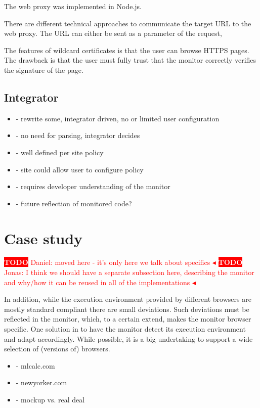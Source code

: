 \documentclass{llncs}
\newcommand{\todo}[1]{\colorbox{red}{\textcolor{white}{\sffamily\bfseries\scriptsize TODO}} \textcolor{red}{#1} \textcolor{red}{$\blacktriangleleft$}}
\begin{document}
The web proxy was implemented in Node.js. 

There are different technical approaches to communicate the target URL to the web 
proxy. The URL can either be sent as a parameter of the request, 

The features of wildcard certificates is that the user can browse HTTPS pages. The drawback is that the user must fully trust that the monitor correctly verifies the signature of the page.

\subsection{Integrator}

\begin{itemize}
\item- rewrite some, integrator driven, no or limited user configuration
\item- no need for parsing, integrator decides
\item- well defined per site policy
\item- site could allow user to configure policy
\item- requires developer understanding of the monitor
\item- future reflection of monitored code?
\end{itemize}


\section{Case study}
\label{sec:case}

\todo{Daniel: moved here - it's only here we talk about specifics}
\todo{Jonas: I think we should have a separate subsection here, describing the monitor and why/how it can be reused in all of the implementations}

In addition, while the
execution environment provided by different browsers are mostly standard
compliant there are small deviations. Such deviations must be reflected in 
the monitor, which, to a certain extend, makes the monitor browser specific.
One solution in to have the monitor detect its execution environment
and adapt accordingly. While possible, it is a big undertaking to support
a wide selection of (versions of) browsers.

\begin{itemize}
\item- mlcalc.com
\item- newyorker.com
\item- mockup vs. real deal
\end{itemize}
\end{document}
